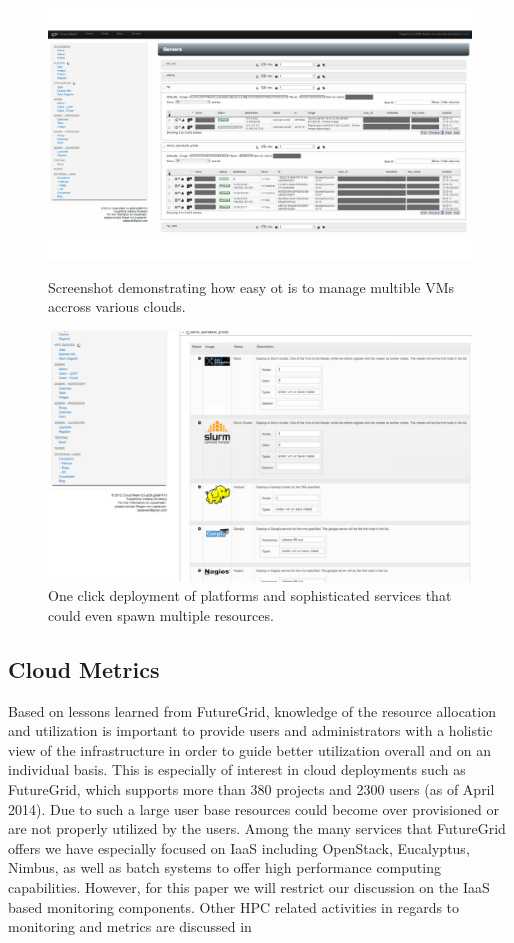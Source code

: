 \documentclass{tex/sig-alternate-2013}
\newcommand{\todo}[1]{{\color{red}{#1}}}
\begin{document}
{\begin{figure}[htb]
  \centering
    \includegraphics[width=1.0\columnwidth]{images/instances.pdf}
  \caption{Screenshot demonstrating how easy ot is to manage multible VMs accross various clouds.}\label{F:instances}
  \centering
    \includegraphics[width=1.0\columnwidth]{images/oneclick.pdf}
  \caption{One click deployment of platforms and sophisticated
    services that could even spawn multiple resources.}\label{F:oneclick}
\end{figure}

\subsection{Cloud Metrics}

\todo{READ}

Based on lessons learned from FutureGrid, knowledge of the resource allocation and utilization is important to provide users and administrators with a holistic view of the infrastructure in order to guide better utilization overall and on an individual basis. This is especially of interest in cloud deployments such as FutureGrid, which supports more than 380 projects and 2300 users (as of April 2014). Due to such a large user base resources could become over provisioned or are not properly utilized by the users. Among the many services that FutureGrid offers we have especially focused on IaaS including OpenStack, Eucalyptus, Nimbus, as well as batch systems to offer high performance computing capabilities.  However, for this paper we will restrict our discussion on the IaaS based monitoring components.  Other HPC related activities in regards to monitoring and metrics are discussed in \cite{ubmod,las12xdmod-kernel,las12xdmod-planing,las13xdmod,smith13info}

}
\end{document}
